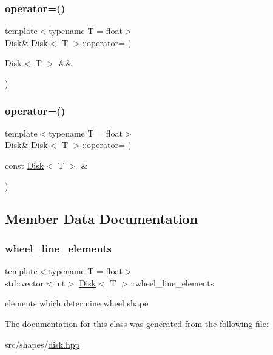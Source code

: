 \subsubsection{\texorpdfstring{operator=()}{operator=()}\hspace{0.1cm}{\footnotesize\ttfamily [1/2]}}
{\footnotesize\ttfamily template$<$typename T  = float$>$ \\
\mbox{\hyperlink{classDisk}{Disk}}\& \mbox{\hyperlink{classDisk}{Disk}}$<$ T $>$\+::operator= (\begin{DoxyParamCaption}\item[{\mbox{\hyperlink{classDisk}{Disk}}$<$ T $>$ \&\&}]{ }\end{DoxyParamCaption})\hspace{0.3cm}{\ttfamily [default]}}

\mbox{\label{classDisk_a3ef862dd6e4671c907e2368bb5239bd2}} 
\subsubsection{\texorpdfstring{operator=()}{operator=()}\hspace{0.1cm}{\footnotesize\ttfamily [2/2]}}
{\footnotesize\ttfamily template$<$typename T  = float$>$ \\
\mbox{\hyperlink{classDisk}{Disk}}\& \mbox{\hyperlink{classDisk}{Disk}}$<$ T $>$\+::operator= (\begin{DoxyParamCaption}\item[{const \mbox{\hyperlink{classDisk}{Disk}}$<$ T $>$ \&}]{ }\end{DoxyParamCaption})\hspace{0.3cm}{\ttfamily [default]}}



\subsection{Member Data Documentation}
\mbox{\label{classDisk_aa008e8bd0e7acdb4a1a56a8f44f048d7}} 
\subsubsection{\texorpdfstring{wheel\+\_\+line\+\_\+elements}{wheel\_line\_elements}}
{\footnotesize\ttfamily template$<$typename T  = float$>$ \\
std\+::vector$<$int$>$ \mbox{\hyperlink{classDisk}{Disk}}$<$ T $>$\+::wheel\+\_\+line\+\_\+elements\hspace{0.3cm}{\ttfamily [private]}}

elements which determine wheel shape 

The documentation for this class was generated from the following file\+:\begin{DoxyCompactItemize}
\item 
src/shapes/\mbox{\hyperlink{disk_8hpp}{disk.\+hpp}}\end{DoxyCompactItemize}
